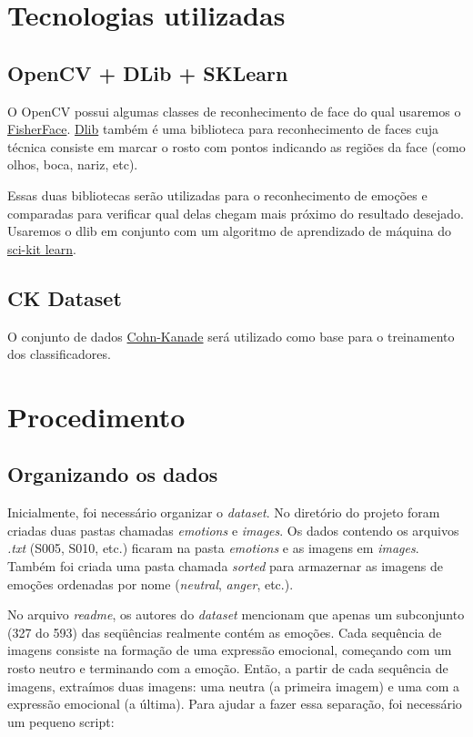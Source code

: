 \documentclass[a4paper, 12pt]{article}
\begin{document}
\section{Tecnologias utilizadas}

\subsection{OpenCV + DLib + SKLearn}

O OpenCV possui algumas classes de reconhecimento de face do qual usaremos o \href{http://www.scholarpedia.org/article/Fisherfaces}{FisherFace}. \href{http://dlib.net/}{Dlib} também é uma biblioteca para reconhecimento de faces cuja técnica consiste em marcar o rosto com pontos indicando as regiões da face (como olhos, boca, nariz, etc).

Essas duas bibliotecas serão utilizadas para o reconhecimento de emoções e comparadas para verificar qual delas chegam mais próximo do resultado desejado. Usaremos o dlib em conjunto com um algoritmo de aprendizado de máquina do \href{http://scikit-learn.org/stable/}{sci-kit learn}.

\subsection{CK Dataset}

O conjunto de dados \href{http://www.pitt.edu/~emotion/ck-spread.htm}{Cohn-Kanade} será utilizado como base para o treinamento dos classificadores.

\section{Procedimento}

\subsection{Organizando os dados}

Inicialmente, foi necessário organizar o \textit{dataset}. No diretório do projeto foram criadas duas pastas chamadas \textit{emotions} e \textit{images}. Os dados contendo os arquivos \textit{.txt} (S005, S010, etc.) ficaram na pasta \textit{emotions} e as imagens em \textit{images}. Também foi criada uma pasta chamada \textit{sorted} para armazernar as imagens de emoções ordenadas por nome (\textit{neutral}, \textit{anger}, etc.). 

No arquivo \textit{readme}, os autores do \textit{dataset} mencionam que apenas um subconjunto (327 do 593) das seqüências realmente contém as emoções. Cada sequência de imagens consiste na formação de uma expressão emocional, começando com um rosto neutro e terminando com a emoção. Então, a partir de cada sequência de imagens, extraímos duas imagens: uma neutra (a primeira imagem) e uma com a expressão emocional (a última). Para ajudar a fazer essa separação, foi necessário um pequeno script:
\end{document}
